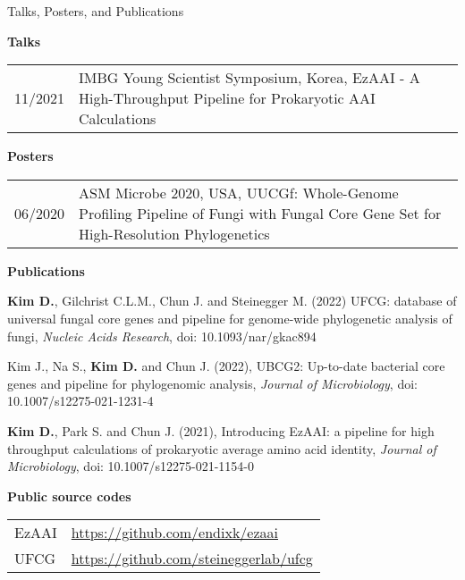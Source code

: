 \documentclass{resume} %
\begin{document}
\begin{rSection}{Talks, Posters, and Publications}
\vspace{2mm}

{\bf Talks }\vspace{1mm}

\begin{tabular}{p{2.5cm}p{14.1cm}}
11/2021 & IMBG Young Scientist Symposium, Korea, EzAAI - A High-Throughput Pipeline for Prokaryotic AAI Calculations
\\[1mm]
\end{tabular}
\vspace{1mm}

{\bf Posters }\vspace{1mm}

\begin{tabular}{p{2.5cm}p{14.1cm}}
06/2020 & ASM Microbe 2020, USA, UUCGf: Whole-Genome Profiling Pipeline of Fungi with Fungal Core Gene Set for High-Resolution Phylogenetics
\\[1mm]
\end{tabular}
\vspace{1mm}


{\bf Publications}\\[-26mm]

\begin{thebibliography}{10}

\vspace{8mm}
{\bf Kim D.}, Gilchrist C.L.M., Chun J. and Steinegger M. (2022)
UFCG: database of universal fungal core genes and pipeline for genome-wide phylogenetic analysis of fungi, {\em Nucleic Acids Research}, doi: 10.1093/nar/gkac894

Kim J., Na S., {\bf Kim D.} and Chun J.  (2022), 
UBCG2: Up-to-date bacterial core genes and pipeline for phylogenomic analysis, {\em Journal of Microbiology}, doi: 10.1007/s12275-021-1231-4

{\bf Kim D.}, Park S. and Chun J. (2021),
Introducing EzAAI: a pipeline for high throughput calculations of prokaryotic average amino acid identity, {\em Journal of Microbiology}, doi: 10.1007/s12275-021-1154-0

\end{thebibliography}
\vspace{4mm}

{\bf Public source codes }\vspace{1mm} 

\begin{tabular}{p{2.5cm}p{14.1cm}}
EzAAI  & \url{https://github.com/endixk/ezaai} \\[1.mm]
UFCG  & \url{https://github.com/steineggerlab/ufcg} \\[1.mm]
\end{tabular}
\vspace{1mm}

\end{rSection}
\end{document}
